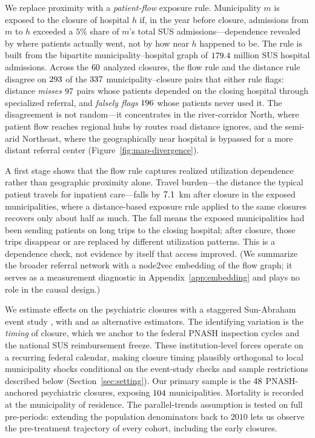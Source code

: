 We replace proximity with a \emph{patient-flow} exposure rule.
Municipality $m$ is exposed to the closure of hospital $h$ if, in the
year before closure, admissions from $m$ to $h$ exceeded a $5\%$ share
of $m$'s total SUS admissions---dependence revealed by where patients
actually went, not by how near $h$ happened to be. The rule is built
from the bipartite municipality--hospital graph of $179.4$ million SUS
hospital admissions. Across the $60$ analyzed closures, the flow rule
and the distance rule disagree on $293$ of the $337$ municipality--closure
pairs that either rule flags: distance \emph{misses} $97$ pairs whose
patients depended on the closing hospital through specialized referral,
and \emph{falsely flags} $196$ whose patients never used it. The
disagreement is not random---it concentrates in the river-corridor
North, where patient flow reaches regional hubs by routes road distance
ignores, and the semi-arid Northeast, where the geographically near
hospital is bypassed for a more distant referral center
(Figure~\ref{fig:map-divergence}).

A first stage shows that the flow rule captures realized utilization
dependence rather than geographic proximity alone. Travel burden---the
distance the typical patient travels for inpatient care---falls by
$7.1$~km after closure in the exposed municipalities, where a
distance-based exposure rule applied to the same closures recovers only
about half as much. The fall means the exposed municipalities had been
sending patients on long trips to the closing hospital; after closure,
those trips disappear or are replaced by different utilization patterns.
This is a dependence check, not evidence by itself that access improved.
(We summarize the broader referral network with a node2vec embedding of
the flow graph; it serves as a measurement diagnostic in
Appendix~\ref{app:embedding} and plays no role in the causal design.)

We estimate effects on the psychiatric closures with a staggered
Sun-Abraham event study \citep{sunAbraham2021}, with
\citet{cs2021} and \citet{borusyak2024} as alternative estimators. The
identifying variation is the \emph{timing} of closure, which we anchor
to the federal PNASH inspection cycles and the national SUS
reimbursement freeze. These institution-level forces operate on a
recurring federal calendar, making closure timing plausibly orthogonal
to local municipality shocks conditional on the event-study checks and
sample restrictions described below (Section~\ref{sec:setting}). Our primary sample is the
$48$ PNASH-anchored psychiatric closures, exposing $104$ municipalities.
Mortality is recorded at the municipality of residence. The
parallel-trends assumption is tested on full pre-periods: extending the
population denominators back to $2010$ lets us observe the
pre-treatment trajectory of every cohort, including the early closures.

